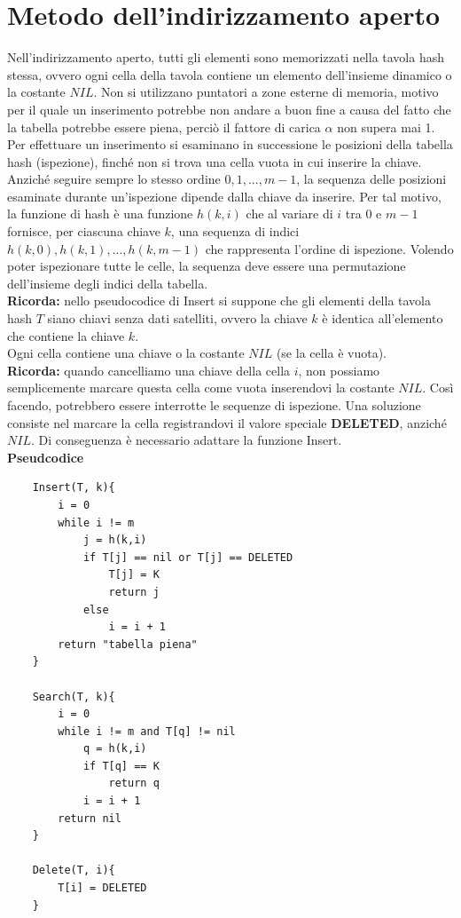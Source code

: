 \section{Metodo dell'indirizzamento aperto}
Nell’indirizzamento aperto, tutti gli elementi sono memorizzati nella tavola hash stessa, ovvero
ogni cella della tavola contiene un elemento dell’insieme dinamico o la costante $NIL$. Non si
utilizzano puntatori a zone esterne di memoria, motivo per il quale un inserimento potrebbe
non andare a buon fine a causa del fatto che la tabella potrebbe essere piena, perciò il fattore
di carica $\alpha$ non supera mai 1.
Per effettuare un inserimento si esaminano in successione le posizioni della tabella hash (ispezione), 
finché non si trova una cella vuota in cui inserire la chiave. Anziché seguire sempre lo
stesso ordine $0, 1, ..., m-1$, la sequenza delle posizioni esaminate durante un’ispezione dipende
dalla chiave da inserire. Per tal motivo, la funzione di hash è una funzione $h(k, i)$ che al variare
di $i$ tra $0$ e $m-1$ fornisce, per ciascuna chiave $k$, una sequenza di indici ${h(k,0), h(k,1), ..., h(k,m-1)}$ 
che rappresenta l’ordine di ispezione. Volendo poter ispezionare tutte le celle, la sequenza
deve essere una permutazione dell’insieme degli indici della tabella.\bigskip\\
\textbf{Ricorda:} nello pseudocodice di Insert si suppone che gli elementi della tavola hash $T$ siano chiavi senza dati satelliti, 
ovvero la chiave $k$ è identica all'elemento che contiene la chiave $k$.\\
Ogni cella contiene una chiave o la costante $NIL$ (se la cella è vuota).\bigskip\\
\textbf{Ricorda:} quando cancelliamo una chiave della cella $i$, non possiamo semplicemente 
marcare questa cella come vuota inserendovi la costante $NIL$. Così facendo, 
potrebbero essere interrotte le sequenze di ispezione. Una soluzione consiste nel marcare 
la cella registrandovi il valore speciale \textbf{DELETED}, anziché $NIL$. 
Di conseguenza è necessario adattare la funzione Insert.\bigskip\\
\textbf{Pseudcodice}
\begin{verbatim}
    Insert(T, k){
        i = 0
        while i != m
            j = h(k,i)
            if T[j] == nil or T[j] == DELETED
                T[j] = K
                return j
            else 
                i = i + 1
        return "tabella piena" 
    }

    Search(T, k){
        i = 0
        while i != m and T[q] != nil
            q = h(k,i)
            if T[q] == K
                return q
            i = i + 1
        return nil 
    }

    Delete(T, i){
        T[i] = DELETED
    }
\end{verbatim}
